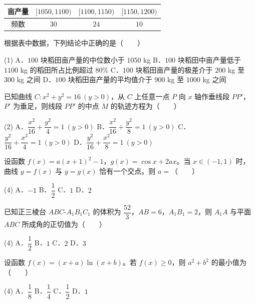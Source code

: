 \begin{center}
\begin{tabular}{cccc}
\toprule
亩产量 & $[1050,1100)$ & $[1100,1150)$ & $[1150,1200)$ \\
\midrule
频数 & $30$ & $24$ & $10$ \\
\bottomrule
\end{tabular}
\end{center}

  根据表中数据，下列结论中正确的是（　　）

\begin{gkopts}(1)
\task A．$100$ 块稻田亩产量的中位数小于 $1050$ kg
\task B．$100$ 块稻田中亩产量低于 $1100$ kg 的稻田所占比例超过 $80\%$
\task C．$100$ 块稻田亩产量的极差介于 $200$ kg 至 $300$ kg 之间
\task D．$100$ 块稻田亩产量的平均值介于 $900$ kg 至 $1000$ kg 之间
\end{gkopts}

已知曲线 $C:x^{2}+y^{2}=16\ (y>0)$，从 $C$ 上任意一点 $P$ 向 $x$ 轴作垂线段 $PP'$，$P'$ 为垂足，则线段 $PP'$ 的中点 $M$ 的轨迹方程为（　　）

\begin{gkopts}(2)
\task A．$\dfrac{x^{2}}{16}+\dfrac{y^{2}}4=1\ (y>0)$
\task B．$\dfrac{x^{2}}{16}+\dfrac{y^{2}}8=1\ (y>0)$
\task C．$\dfrac{y^{2}}{16}+\dfrac{x^{2}}4=1\ (y>0)$
\task D．$\dfrac{y^{2}}{16}+\dfrac{x^{2}}8=1\ (y>0)$
\end{gkopts}

设函数 $f(x)=a(x+1)^{2}-1$，$g(x)=\cos x+2ax$。当 $x\in(-1,1)$ 时，曲线 $y=f(x)$ 与 $y=g(x)$ 恰有一个交点。则 $a=$（　　）

\begin{gkopts}(4)
\task A．$-1$
\task B．$\dfrac12$
\task C．$1$
\task D．$2$
\end{gkopts}

已知正三棱台 $ABC\text{-}A_1B_1C_1$ 的体积为 $\dfrac{52}3$，$AB=6$，$A_1B_1=2$，则 $A_1A$ 与平面 $ABC$ 所成角的正切值为（　　）

\begin{gkopts}(4)
\task A．$\dfrac12$
\task B．$1$
\task C．$2$
\task D．$3$
\end{gkopts}

设函数 $f(x)=(x+a)\ln(x+b)$。若 $f(x)\ge0$，则 $a^{2}+b^{2}$ 的最小值为（　　）

\begin{gkopts}(4)
\task A．$\dfrac18$
\task B．$\dfrac14$
\task C．$\dfrac12$
\task D．$1$
\end{gkopts}

